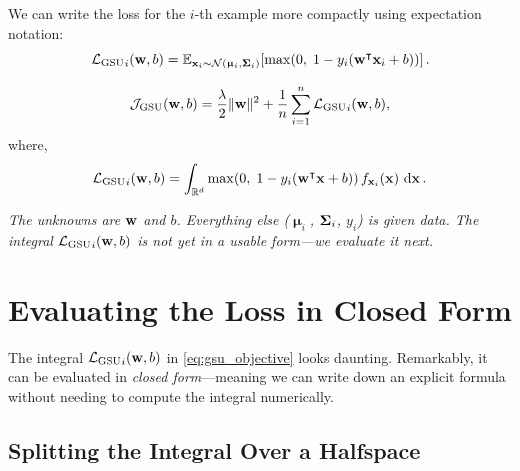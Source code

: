 \documentclass[11pt, letterpaper]{article}
\newcommand{\bSigma}{\vb{\Sigma}}
\newcommand{\bmu}{\boldsymbol{\upmu}}
\newcommand{\E}{\mathbb{E}}
\newcommand{\R}{\mathbb{R}}
\newcommand{\loss}{\mathcal{L}}
\newcommand{\obj}{\mathcal{J}}
\newcommand{\Norm}{\mathcal{N}}
\begin{document}
We can write the loss for the $i$-th example more compactly using expectation notation:
\begin{equation}\label{eq:gsu_loss_compact}
    {\loss_{\text{GSU}}}_{i}(\vb{w}, b) = \E_{\vb{x}_i \sim \Norm(\bmu_i, \bSigma_i)}\!\left[\max\!\left(0,\; 1 - y_i\!\left(\vb{w}^{\intercal} \vb{x}_i + b\right)\right)\right].
\end{equation}

\begin{statusbox}
\vspace{-0.5em}
\begin{equation*}
    \obj_{\text{GSU}} (\vb{w}, b) = \frac{\lambda}{2}\|\vb{w}\|^2 + \frac{1}{n}\sum_{i=1}^{n} {\loss_{\text{GSU}}}_{i}(\vb{w}, b),
\end{equation*}
where,
\begin{equation*}
    {\loss_{\text{GSU}}}_{i}(\vb{w}, b) = \int_{\R^d} \max\!\left(0,\; 1 - y_i(\vb{w}^{\intercal}\vb{x}+b)\right) f_{\vb{x}_i}(\vb{x})\,\dd{\vb{x}}.
\end{equation*}
\vspace{-1em}
\begin{center}\small
\emph{The unknowns are $\vb{w}$ and $b$. Everything else ($\bmu_i$, $\bSigma_i$, $y_i$) is given data. The integral ${\loss_{\text{GSU}}}_{i}(\vb{w}, b)$ is not yet in a usable form---we evaluate it next.}
\end{center}
\end{statusbox}

\section{Evaluating the Loss in Closed Form}\label{sec:loss_closed_form}

The integral ${\loss_{\text{GSU}}}_{i}(\vb{w}, b)$ in \cref{eq:gsu_objective} looks daunting. Remarkably, it can be evaluated in \emph{closed form}---meaning we can write down an explicit formula without needing to compute the integral numerically.

\subsection{Splitting the Integral Over a Halfspace}
\end{document}

